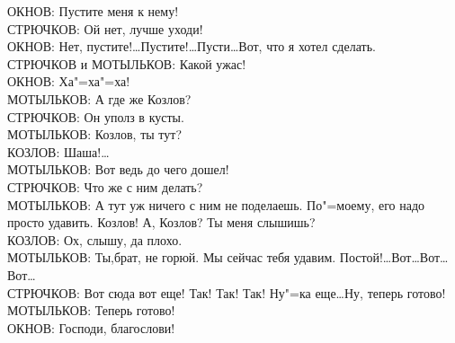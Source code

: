 ОКНОВ: Пустите меня к нему! \\
СТРЮЧКОВ: Ой нет, лучше уходи! \\
ОКНОВ: Нет, пустите!\dots Пустите!\dots Пусти\dots Вот, что я хотел сделать. \\
СТРЮЧКОВ и МОТЫЛЬКОВ: Какой ужас! \\
ОКНОВ: Ха"=ха"=ха! \\
МОТЫЛЬКОВ: А где же Козлов? \\
СТРЮЧКОВ: Он уполз в кусты. \\
МОТЫЛЬКОВ: Козлов, ты тут? \\
КОЗЛОВ: Шаша!\dots \\
МОТЫЛЬКОВ: Вот ведь до чего дошел! \\
СТРЮЧКОВ: Что же с ним делать? \\
МОТЫЛЬКОВ: А тут уж ничего с ним не поделаешь. По"=моему, его надо просто удавить. Козлов! А, Козлов? Ты меня слышишь? \\
КОЗЛОВ: Ох, слышу, да плохо. \\
МОТЫЛЬКОВ: Ты,брат, не горюй. Мы сейчас тебя удавим. Постой!\dots Вот\dots Вот\dots Вот\dots \\
СТРЮЧКОВ: Вот сюда вот еще! Так! Так! Так! Ну"=ка еще\dots Ну, теперь готово! \\
МОТЫЛЬКОВ: Теперь готово! \\
ОКНОВ: Господи, благослови! \\

